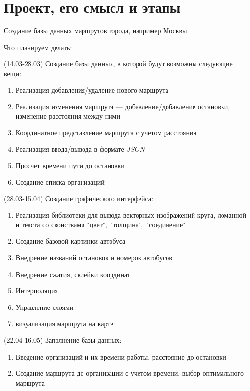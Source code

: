  \section{Проект, его смысл и этапы} 
 
 Создание базы данных маршрутов города, например Москвы.
 
 Что планируем делать: 
 
 (14.03-28.03) Создание базы данных, в которой будут возможны следующие вещи: 
 
 \begin{enumerate} 
     \item Реализация добавления/удаление нового маршрута 
     \item Реализация изменения маршрута --- добавление/добавление остановки, изменение расстояния между ними  
     \item Координатное представление маршрута с учетом расстояния  
     \item Реализация ввода/вывода в формате $JSON$ 
     \item Просчет времени пути до остановки 
     \item Создание списка организаций 
 \end{enumerate}
 
(28.03-15.04) Создание графического интерфейса: 
 
 \begin{enumerate}
     \item Реализация библиотеки для вывода векторных изображений круга, ломанной и текста со свойствами "цвет"$,$ "толщина"$,$ "соединение"  
     \item Создание базовой картинки автобуса 
     \item Внедрение названий остановок и номеров автобусов 
     \item Внедрение сжатия, склейки координат 
     \item Интерполяция  
     \item Управление слоями 
     \item визуализация маршрута на карте  
 \end{enumerate} 
 
 (22.04-16.05) Заполнение базы данных: 
 
 \begin{enumerate}
     \item Введение организаций и их времени работы, расстояние до остановки  
     \item Создание маршрута до организации с учетом времени, выбор оптимального маршрута 
 \end{enumerate}
